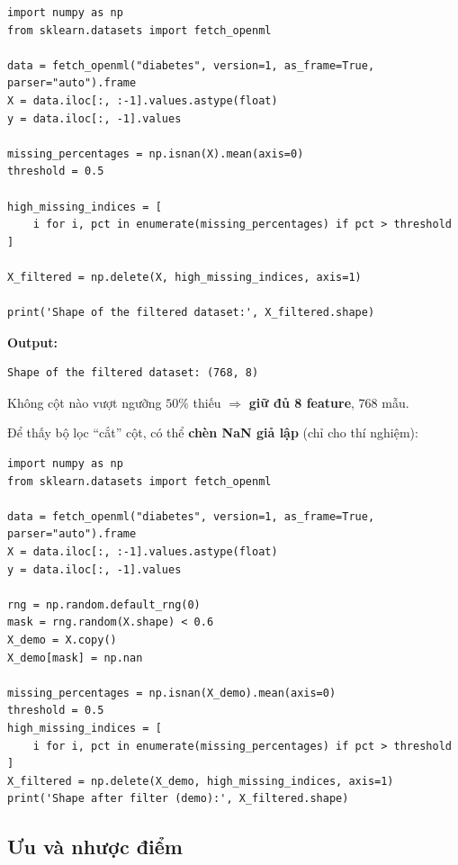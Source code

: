\begin{vidu}[title={Mã đầy đủ}]
\begin{lstlisting}
import numpy as np
from sklearn.datasets import fetch_openml

data = fetch_openml("diabetes", version=1, as_frame=True, parser="auto").frame
X = data.iloc[:, :-1].values.astype(float)
y = data.iloc[:, -1].values

missing_percentages = np.isnan(X).mean(axis=0)
threshold = 0.5

high_missing_indices = [
    i for i, pct in enumerate(missing_percentages) if pct > threshold
]

X_filtered = np.delete(X, high_missing_indices, axis=1)

print('Shape of the filtered dataset:', X_filtered.shape)
\end{lstlisting}
\end{vidu}

\begin{ynghia}[title={Kết quả đầu ra (diabetes OpenML)}]
\textbf{Output:}
\begin{lstlisting}
Shape of the filtered dataset: (768, 8)
\end{lstlisting}
Không cột nào vượt ngưỡng $50\%$ thiếu $\Rightarrow$ \textbf{giữ đủ 8 feature}, $768$ mẫu.
\end{ynghia}

\begin{phuongphap}[title={Minh họa khi cần NaN tổng hợp}]
Để thấy bộ lọc ``cắt'' cột, có thể \textbf{chèn NaN giả lập} (chỉ cho thí nghiệm):
\begin{lstlisting}
import numpy as np
from sklearn.datasets import fetch_openml

data = fetch_openml("diabetes", version=1, as_frame=True, parser="auto").frame
X = data.iloc[:, :-1].values.astype(float)
y = data.iloc[:, -1].values

rng = np.random.default_rng(0)
mask = rng.random(X.shape) < 0.6
X_demo = X.copy()
X_demo[mask] = np.nan

missing_percentages = np.isnan(X_demo).mean(axis=0)
threshold = 0.5
high_missing_indices = [
    i for i, pct in enumerate(missing_percentages) if pct > threshold
]
X_filtered = np.delete(X_demo, high_missing_indices, axis=1)
print('Shape after filter (demo):', X_filtered.shape)
\end{lstlisting}
\end{phuongphap}

\subsection{Ưu và nhược điểm}

